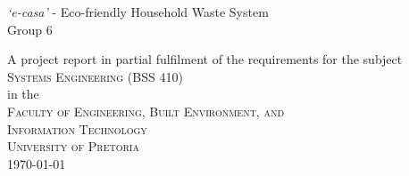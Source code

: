 \thispagestyle{empty}
\begin{center}
{\huge \textit{`e-casa'} - Eco-friendly Household Waste System}
\vspace{20mm} \\
{\Large Group 6}
\vfill

A project report in partial fulfilment of the requirements for the subject\\
\vspace{10mm}
{\Large \textsc{Systems Engineering (BSS 410)}} \\
\vfill
%
in the \\
\vspace{20mm}
%
{\Large \textsc{Faculty of Engineering, Built Environment, and \\ 
Information Technology}}\\
%
\vspace{10mm}
{\Large\textsc{University of Pretoria}} \\
%
\vfill
%
\today
\end{center}
